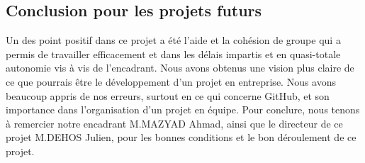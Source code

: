 \documentclass[a4paper,oneside]{article}
\begin{document}
\subsection{Conclusion pour les projets futurs}

Un des point positif dans ce projet a été l'aide et la cohésion de groupe qui a permis de travailler efficacement et dans les délais impartis et en quasi-totale autonomie vis à vis de l'encadrant.
Nous avons obtenus une vision plus claire de ce que pourrais être le développement d'un projet en entreprise.
Nous avons beaucoup appris de nos erreurs, surtout en ce qui concerne GitHub, et son importance dans l'organisation d'un projet en équipe.
Pour conclure, nous tenons à remercier notre encadrant M.MAZYAD Ahmad, ainsi que le directeur de ce projet M.DEHOS Julien, pour les bonnes conditions et le bon déroulement de ce projet. 





\label{myLastPage}
\end{document}
